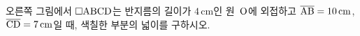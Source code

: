 \noindent\begin{minipage}[t]{0.58\linewidth}\vspace{0pt}\raggedright 오른쪽 그림에서 $\square\mathrm{ABCD}$는 반지름의 길이가 $4\,\mathrm{cm}$인 원~$\mathrm{O}$에 외접하고 $\overline{\mathrm{AB}}=10\,\mathrm{cm}$, $\overline{\mathrm{CD}}=7\,\mathrm{cm}$일 때, 색칠한 부분의 넓이를 구하시오.\end{minipage}\hfill\begin{minipage}[t]{0.4\linewidth}\vspace{0pt}\centering \resizebox{\ifdim\width>\linewidth\linewidth\else\width\fi}{!}{}\end{minipage}\par
